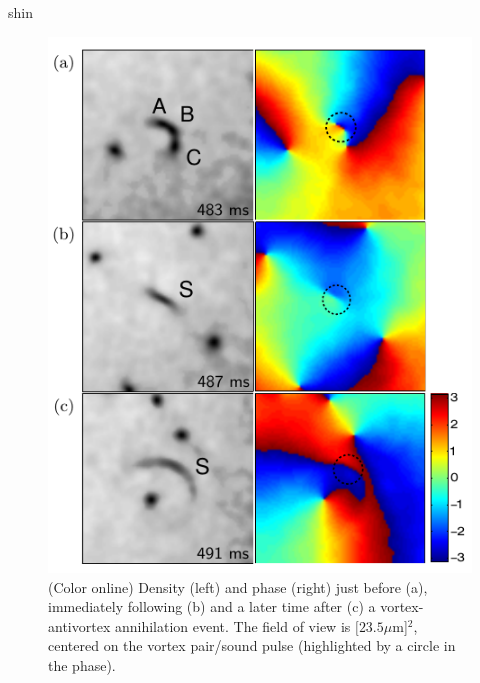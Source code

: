 \begin{chapter}{\label{cha:shin}shin}

\begin{figure}
\includegraphics[width=0.8\linewidth]{shin/fig5}
\caption{\label{fig:cresentPlots} (Color online) Density (left) and phase (right) just before (a), immediately following (b) and a later time after (c) a vortex-antivortex annihilation event.  The field of view is  $[23.5\mu$m]$^2$, centered on the vortex pair/sound pulse (highlighted by a circle in the phase).
}
\end{figure}


\end{chapter}
